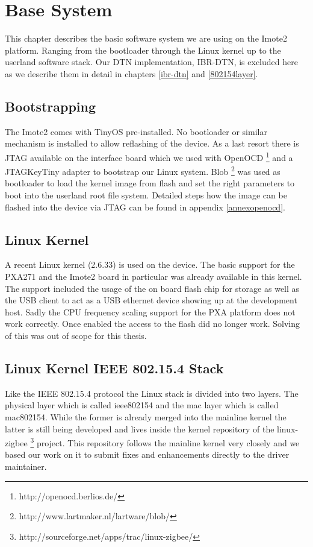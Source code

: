 \chapter{Base System}
This chapter describes the basic software system we are using on the Imote2
platform. Ranging from the bootloader through the Linux kernel up to the
userland software stack. Our DTN implementation, IBR-DTN, is excluded here as we
describe them in detail in chapters \ref{ibr-dtn} and \ref{802154layer}.

\section{Bootstrapping}
The Imote2 comes with TinyOS pre-installed. No bootloader or similar mechanism
is installed to allow reflashing of the device. As a last resort there is JTAG
available on the interface board which we used  with OpenOCD
\footnote{http://openocd.berlios.de/} and a
JTAGKeyTiny adapter to bootstrap our Linux system. Blob
\footnote{http://www.lartmaker.nl/lartware/blob/} was used as bootloader to
load the kernel image from flash and set the right parameters to boot into the
userland root file system. Detailed steps how the image can be flashed into the
device via JTAG can be found in appendix \ref{annexopenocd}.

\section{Linux Kernel}
A recent Linux kernel (2.6.33) is used on the device. The basic support for the
PXA271 and the Imote2 board in particular was already available in this kernel.
The support included the usage of the on board flash chip for storage as well as
the USB client to act as a USB ethernet device showing up at the development host.
Sadly the CPU frequency scaling support for the PXA platform does not work
correctly. Once enabled the access to the flash did no longer work.
Solving of this was out of scope for this thesis.

\section{Linux Kernel IEEE 802.15.4 Stack}
Like the IEEE 802.15.4 protocol the Linux stack is divided into two layers. The
physical layer which is called ieee802154 and the mac layer which is called
mac802154. While the former is already merged into the mainline kernel the latter
is still being developed and lives inside the kernel repository of the
linux-zigbee \footnote{http://sourceforge.net/apps/trac/linux-zigbee/} project.
This repository follows the mainline kernel very closely and we based our work
on it to submit fixes and enhancements directly to the driver maintainer.

